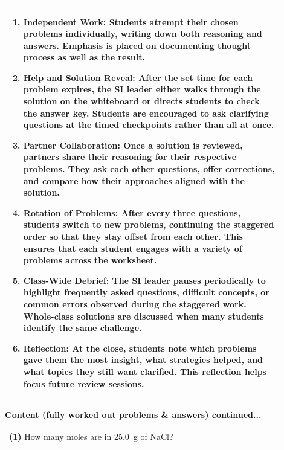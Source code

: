 \documentclass{article}
\begin{document}
{{\begin{tabular}{|p{0.9\linewidth}|}
\begin{enumerate}
    \item \textbf{Independent Work:} Students attempt their chosen problems individually, writing down both reasoning and answers. Emphasis is placed on documenting thought process as well as the result.
    
    \item \textbf{Help and Solution Reveal:} After the set time for each problem expires, the SI leader either walks through the solution on the whiteboard or directs students to check the answer key. Students are encouraged to ask clarifying questions at the timed checkpoints rather than all at once.
    
    \item \textbf{Partner Collaboration:} Once a solution is reviewed, partners share their reasoning for their respective problems. They ask each other questions, offer corrections, and compare how their approaches aligned with the solution.
    
    \item \textbf{Rotation of Problems:} After every three questions, students switch to new problems, continuing the staggered order so that they stay offset from each other. This ensures that each student engages with a variety of problems across the worksheet.
    
    \item \textbf{Class-Wide Debrief:} The SI leader pauses periodically to highlight frequently asked questions, difficult concepts, or common errors observed during the staggered work. Whole-class solutions are discussed when many students identify the same challenge.
    
    \item \textbf{Reflection:} At the close, students note which problems gave them the most insight, what strategies helped, and what topics they still want clarified. This reflection helps focus future review sessions.
\end{enumerate}\\
\hline
\end{tabular}
\newpage

\noindent
{\large\textbf{Content (fully worked out problems \& answers) continued...}}\\[0.2em]
\vspace{0.2cm}

\noindent\begin{tabular}{|p{0.9\linewidth}|}
\hline
\vspace{0.2cm}
\textbf{(1)} How many moles are in 25.0~g of NaCl?\\[0.2cm]


\end{tabular}}}
\end{document}
